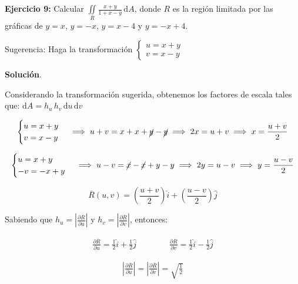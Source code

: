 \documentclass[12pt]{article}
\begin{document}
\noindent \textbf{Ejercicio 9:} Calcular $\iint\limits_R \frac{x+y}{1+x-y}\, \mathrm{d}A$, donde $R$ es la región limitada por las gráficas de $y=x$, $y=-x$, $y=x-4$ y $y=-x+4$.

\vspace{3mm}

\noindent Sugerencia: Haga la transformación $\begin{cases} u = x+y\\v=x-y\end{cases}$

\noindent \textbf{Solución}.

\vspace{3mm}

\noindent Considerando la transformación sugerida, obtenemos los factores de escala tales que: $\mathrm{d}A = h_u\,h_v\,\mathrm{d}u\,\mathrm{d}v$

\begin{align*}
	\begin{cases}
		u = x+y\\
		v=x-y
	\end{cases} \implies u+v=x+x+\cancel{y}-\cancel{y} \implies 2x = u+v \implies x = \frac{u+v}{2}
\end{align*}

\begin{align*}
	\begin{cases}
		u = x+y\\
		-v = -x+y
	\end{cases} \implies u-v=\cancel{x}-\cancel{x}+y-y \implies 2y = u-v \implies y = \frac{u-v}{2}
\end{align*}

\begin{equation}\label{eqn:9-1}\tag{1}
	\overline{R}(u,v)=\left(\frac{u+v}{2}\right)\hat{i} + (\frac{u-v}{2})\hat{j}
\end{equation}

\noindent Sabiendo que $h_u = |\frac{\partial \overline{R}}{\partial u}|$ y $h_v = |\frac{\partial \overline{R}}{\partial v}|$, entonces:

\begin{align*}
	\frac{\partial \overline{R}}{\partial u} = \frac{1}{2}\hat{i} + \frac{1}{2}\hat{j} \qquad \qquad
	\frac{\partial \overline{R}}{\partial v} = \frac{1}{2}\hat{i} - \frac{1}{2}\hat{j}
\end{align*}

\begin{align*}
	\left|\frac{\partial \overline{R}}{\partial u}\right| = \left|\frac{\partial \overline{R}}{\partial v}\right| = \sqrt{\frac{1}{2}}
\end{align*}
\end{document}
